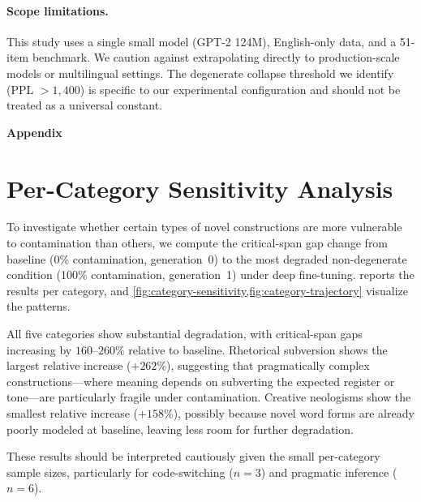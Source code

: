 \documentclass{article}
\begin{document}
\paragraph{Scope limitations.}
This study uses a single small model (GPT-2 124M), English-only data, and a 51-item benchmark.
We caution against extrapolating directly to production-scale models or multilingual settings.
The degenerate collapse threshold we identify (PPL $> 1{,}400$) is specific to our experimental configuration and should not be treated as a universal constant.

\clearpage



\appendix

\clearpage
\begin{center}
\Large\bfseries Appendix
\end{center}
\vspace{1em}

\section{Per-Category Sensitivity Analysis}
\label{sec:appendix-category}

To investigate whether certain types of novel constructions are more vulnerable to contamination than others, we compute the critical-span gap change from baseline (0\% contamination, generation~0) to the most degraded non-degenerate condition (100\% contamination, generation~1) under deep fine-tuning.
 reports the results per category, and \cref{fig:category-sensitivity,fig:category-trajectory} visualize the patterns.

All five categories show substantial degradation, with critical-span gaps increasing by $160$--$260\%$ relative to baseline.
Rhetorical subversion shows the largest relative increase ($+262\%$), suggesting that pragmatically complex constructions---where meaning depends on subverting the expected register or tone---are particularly fragile under contamination.
Creative neologisms show the smallest relative increase ($+158\%$), possibly because novel word forms are already poorly modeled at baseline, leaving less room for further degradation.

These results should be interpreted cautiously given the small per-category sample sizes, particularly for code-switching ($n{=}3$) and pragmatic inference ($n{=}6$).
\end{document}
